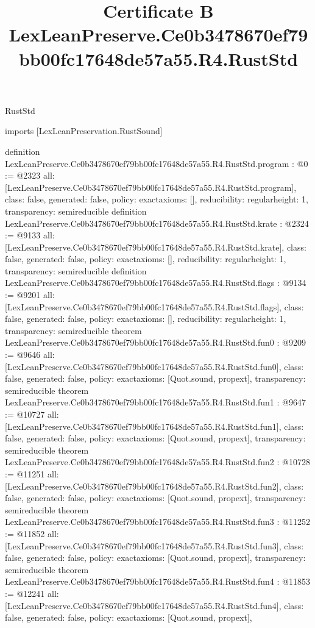 \begin{lexlean}{RustStd}
\title{Certificate B LexLeanPreserve.Ce0b3478670ef79bb00fc17648de57a55.R4.RustStd}
\begin{coremodule}
imports [LexLeanPreservation.RustSound]

definition LexLeanPreserve.Ce0b3478670ef79bb00fc17648de57a55.R4.RustStd.program : @0 := @2323 {
  all: [LexLeanPreserve.Ce0b3478670ef79bb00fc17648de57a55.R4.RustStd.program],
  class: false,
  generated: false,
  policy: exact{axioms: []},
  reducibility: regular{height: 1},
  transparency: semireducible
}
definition LexLeanPreserve.Ce0b3478670ef79bb00fc17648de57a55.R4.RustStd.krate : @2324 := @9133 {
  all: [LexLeanPreserve.Ce0b3478670ef79bb00fc17648de57a55.R4.RustStd.krate],
  class: false,
  generated: false,
  policy: exact{axioms: []},
  reducibility: regular{height: 1},
  transparency: semireducible
}
definition LexLeanPreserve.Ce0b3478670ef79bb00fc17648de57a55.R4.RustStd.flags : @9134 := @9201 {
  all: [LexLeanPreserve.Ce0b3478670ef79bb00fc17648de57a55.R4.RustStd.flags],
  class: false,
  generated: false,
  policy: exact{axioms: []},
  reducibility: regular{height: 1},
  transparency: semireducible
}
theorem LexLeanPreserve.Ce0b3478670ef79bb00fc17648de57a55.R4.RustStd.fun0 : @9209 := @9646 {
  all: [LexLeanPreserve.Ce0b3478670ef79bb00fc17648de57a55.R4.RustStd.fun0],
  class: false,
  generated: false,
  policy: exact{axioms: [Quot.sound, propext]},
  transparency: semireducible
}
theorem LexLeanPreserve.Ce0b3478670ef79bb00fc17648de57a55.R4.RustStd.fun1 : @9647 := @10727 {
  all: [LexLeanPreserve.Ce0b3478670ef79bb00fc17648de57a55.R4.RustStd.fun1],
  class: false,
  generated: false,
  policy: exact{axioms: [Quot.sound, propext]},
  transparency: semireducible
}
theorem LexLeanPreserve.Ce0b3478670ef79bb00fc17648de57a55.R4.RustStd.fun2 : @10728 := @11251 {
  all: [LexLeanPreserve.Ce0b3478670ef79bb00fc17648de57a55.R4.RustStd.fun2],
  class: false,
  generated: false,
  policy: exact{axioms: [Quot.sound, propext]},
  transparency: semireducible
}
theorem LexLeanPreserve.Ce0b3478670ef79bb00fc17648de57a55.R4.RustStd.fun3 : @11252 := @11852 {
  all: [LexLeanPreserve.Ce0b3478670ef79bb00fc17648de57a55.R4.RustStd.fun3],
  class: false,
  generated: false,
  policy: exact{axioms: [Quot.sound, propext]},
  transparency: semireducible
}
theorem LexLeanPreserve.Ce0b3478670ef79bb00fc17648de57a55.R4.RustStd.fun4 : @11853 := @12241 {
  all: [LexLeanPreserve.Ce0b3478670ef79bb00fc17648de57a55.R4.RustStd.fun4],
  class: false,
  generated: false,
  policy: exact{axioms: [Quot.sound, propext]},
}
\end{coremodule}
\end{lexlean}
